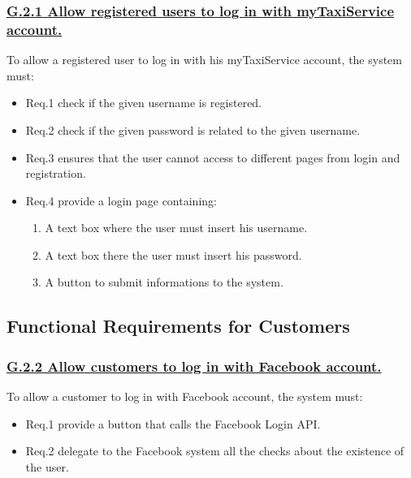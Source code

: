 \documentclass{report}
\begin{document}
			\subsubsection{\lbrack \hyperref[sec:g2_1]{G.2.1 Allow registered users to log in with myTaxiService account.}\rbrack}
			To allow a registered user to log in with his myTaxiService account, the system must:

				\begin{itemize}
					\item \lbrack Req.1\rbrack \label{sec:fr1_g2_1} check if the given username is registered.
					\item \lbrack Req.2\rbrack \label{sec:fr2_g2_1} check if the given password is related to the given username.
					\item \lbrack Req.3\rbrack \label{sec:fr3_g2_1} ensures that the user cannot access to different pages from login and registration.
					\item \lbrack Req.4\rbrack \label{sec:fr4_g2_1} provide a login page containing:
						\begin{enumerate}
							\item A text box where the user must insert his username.
							\item A text box there the user must insert his password.
							\item A button to submit informations to the system.
						\end{enumerate}
				\end{itemize}

		\subsection{Functional Requirements for Customers}

			\subsubsection{\lbrack \hyperref[sec:g2_2]{G.2.2 Allow customers to log in with Facebook account.}\rbrack}
			To allow a customer to log in with Facebook account, the system must:

				\begin{itemize}
					\item \lbrack Req.1\rbrack \label{sec:fr1_g2_2} provide a button that calls the Facebook Login API.
					\item \lbrack Req.2\rbrack \label{sec:fr2_g2_2} delegate to the Facebook system all the checks about the existence of the user.
				\end{itemize}
\end{document}
